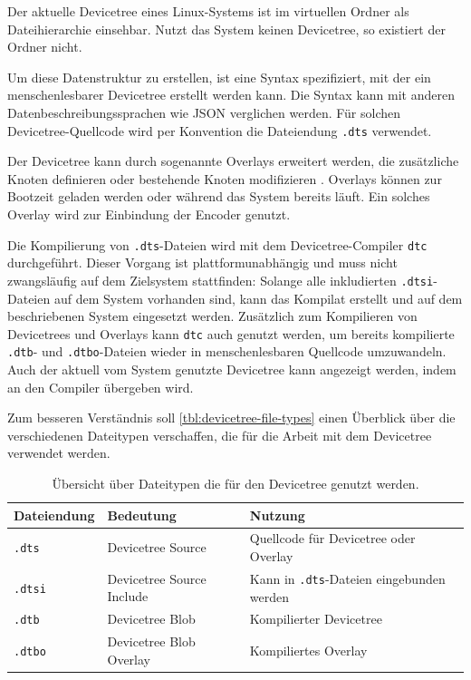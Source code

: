 \documentclass[german]{thesis_KBS}
\newcommand{\code}[1]{\texttt{#1}}  %
\begin{document}
Der aktuelle Devicetree eines Linux-Systems ist im virtuellen Ordner
 als Dateihierarchie einsehbar. Nutzt das System keinen
Devicetree, so existiert der Ordner nicht.

Um diese Datenstruktur zu erstellen, ist eine Syntax spezifiziert, mit der ein
menschenlesbarer Devicetree erstellt werden kann. Die Syntax kann mit anderen
Datenbeschreibungssprachen wie JSON verglichen werden. Für solchen
Devicetree-Quellcode wird per Konvention die Dateiendung \code{.dts} verwendet.

Der Devicetree kann durch sogenannte Overlays erweitert werden, die zusätzliche
Knoten definieren oder bestehende Knoten modifizieren
\cite{devicetree-overlay-notes}. Overlays können zur Bootzeit geladen werden
oder während das System bereits läuft. Ein solches Overlay wird zur Einbindung
der Encoder genutzt.

Die Kompilierung von \code{.dts}-Dateien wird mit dem Devicetree-Compiler
\code{dtc} durchgeführt. Dieser Vorgang ist plattformunabhängig und muss nicht
zwangsläufig auf dem Zielsystem stattfinden: Solange alle inkludierten
\code{.dtsi}-Dateien auf dem System vorhanden sind, kann das Kompilat erstellt
und auf dem beschriebenen System eingesetzt werden. Zusätzlich zum Kompilieren
von Devicetrees und Overlays kann \code{dtc} auch genutzt werden, um bereits
kompilierte \code{.dtb}- und \code{.dtbo}-Dateien wieder in menschenlesbaren
Quellcode umzuwandeln. Auch der aktuell vom System genutzte Devicetree kann
angezeigt werden, indem  an den Compiler übergeben
wird.

Zum besseren Verständnis soll \autoref{tbl:devicetree-file-types} einen
Überblick über die verschiedenen Dateitypen verschaffen, die für die Arbeit mit
dem Devicetree verwendet werden.

\begin{table}
    \centering
    \begin{tabular}{|l|l|l|}
        Dateiendung  & Bedeutung & Nutzung       \\ \hline
        \code{.dts}  & Devicetree Source & Quellcode für Devicetree oder Overlay \\
        \code{.dtsi} & Devicetree Source Include & Kann in \code{.dts}-Dateien eingebunden werden \\
        \code{.dtb}  & Devicetree Blob & Kompilierter Devicetree \\
        \code{.dtbo} & Devicetree Blob Overlay & Kompiliertes Overlay  \\
    \end{tabular}
    \caption{
        Übersicht über Dateitypen die für den Devicetree genutzt werden.
    }
    \label{tbl:devicetree-file-types}
\end{table}
\end{document}
